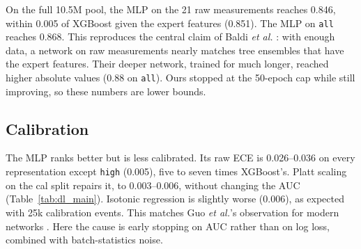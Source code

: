 On the full 10.5M pool, the MLP on the 21 raw measurements reaches 0.846, within 0.005 of XGBoost
given the expert features (0.851). The MLP on \texttt{all} reaches 0.868. This reproduces the central
claim of Baldi \emph{et al.} \cite{baldi2014searching}: with enough data, a network on raw
measurements nearly matches tree ensembles that have the expert features. Their deeper network,
trained for much longer, reached higher absolute values (0.88 on \texttt{all}). Ours stopped at the
50-epoch cap while still improving, so these numbers are lower bounds.

\subsection{Calibration}
The MLP ranks better but is less calibrated. Its raw ECE is 0.026--0.036 on every representation
except \texttt{high} (0.005), five to seven times XGBoost's. Platt scaling on the cal split repairs
it, to 0.003--0.006, without changing the AUC (Table~\ref{tab:dl_main}). Isotonic regression is slightly
worse (0.006), as expected with 25k calibration events. This matches Guo \emph{et al.}'s observation
for modern networks \cite{guo2017calibration}. Here the cause is early stopping on AUC rather than
on log loss, combined with batch-statistics noise.


